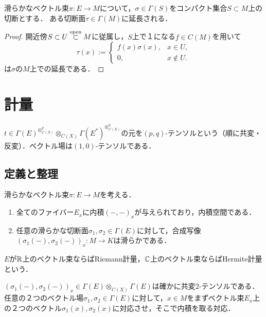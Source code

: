 \documentclass[uplatex,dvipdfmx]{jsreport}
\begin{document}
\begin{proposition}[切断の延長]
    滑らかなベクトル束$\pi:E\to M$について，$\sigma\in\Gamma(S)$をコンパクト集合$S\subset M$上の切断とする．
    ある切断面$\tau\in\Gamma(M)$に延長される．
\end{proposition}
\begin{proof}
    開近傍$S\subset U\overset{\mathrm{open}}{\subset} M$に従属し，$S$上で１になる$f\in C(M)$を用いて
    \[\tau(x):=\begin{cases}
        f(x)\sigma(x),&x\in U,\\
        0,&x\notin U.
    \end{cases}\]
    は$\sigma$の$M$上での延長である．
\end{proof}

\section{計量}

\begin{tcolorbox}[colframe=ForestGreen, colback=ForestGreen!10!white,breakable,colbacktitle=ForestGreen!40!white,coltitle=black,fonttitle=\bfseries\sffamily,
title=]
    $t\in\Gamma(E)^{\otimes^p_{C(X)}}\otimes_{C(X)}\Gamma(E^*)^{\otimes^q_{C(X)}}$の元を$(p,q)$-テンソルという（順に共変・反変）．ベクトル場は$(1,0)$-テンソルである．
\end{tcolorbox}

\subsection{定義と整理}

\begin{definition}[metric]\label{def-metric}
    滑らかなベクトル束$\pi:E\to M$を考える．
    \begin{enumerate}
        \item 全てのファイバー$E_x$に内積$(-,-)_x$が与えられており，内積空間である．
        \item 任意の滑らかな切断面$\sigma_1,\sigma_2\in\Gamma(E)$に対して，合成写像$(\sigma_1(-),\sigma_2(-))_x:M\to K$は滑らかである．
    \end{enumerate}
    $E$が$\mathbb{R}$上のベクトル束ならばRiemann計量，$\mathbb{C}$上のベクトル束ならばHermite計量という．
\end{definition}
\begin{remarks}
    $(\sigma_1(-),\sigma_2(-))_x\in\Gamma(E)\otimes_{C(X)}\Gamma(E)$は確かに共変2-テンソルである．
    任意の２つのベクトル場$\sigma_1,\sigma_2\in\Gamma(E)$に対して，$x\in M$をまずベクトル束$E_x$上の２つのベクトル$\sigma_1(x),\sigma_2(x)$に対応させ，そこで内積を取る対応．
\end{remarks}
\end{document}
